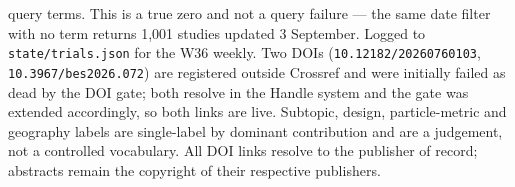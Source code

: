 \documentclass[10pt]{article}
\begin{document}
\begin{keybox}
{query terms. This is a true zero and not a query failure --- the same date filter with no
term returns 1{,}001 studies updated 3 September. Logged to \texttt{state/trials.json} for
the W36 weekly.
Two DOIs (\texttt{10.12182/20260760103}, \texttt{10.3967/bes2026.072}) are registered
outside Crossref and were initially failed as dead by the DOI gate; both resolve in the
Handle system and the gate was extended accordingly, so both links are live.
Subtopic, design, particle-metric and geography labels are single-label by dominant
contribution and are a judgement, not a controlled vocabulary. All DOI links resolve to the
publisher of record; abstracts remain the copyright of their respective publishers.\par}
\end{keybox}
\end{document}
